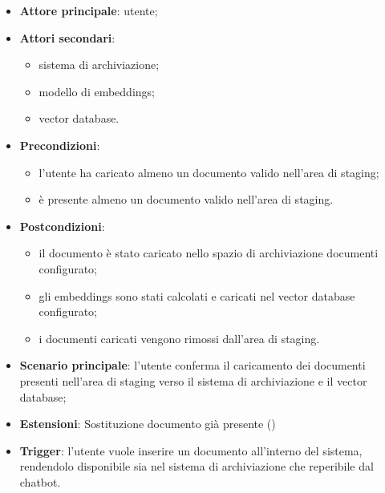 \documentclass[10pt, a4paper]{article}
\begin{document}
    \begin{itemize}
        \item \textbf{Attore principale}: utente;
        \item \textbf{Attori secondari}:
        \begin{itemize}
            \item sistema di archiviazione;
            \item modello di embeddings;
            \item vector database.
        \end{itemize}
        \item \textbf{Precondizioni}:
            \begin{itemize}
                \item l’utente ha caricato almeno un documento valido nell’area di staging;
                \item è presente almeno un documento valido nell’area di staging.
            \end{itemize}
        \item \textbf{Postcondizioni}:
        \begin{itemize}
            \item il documento è stato caricato nello spazio di archiviazione documenti configurato;
            \item gli embeddings sono stati calcolati e caricati nel vector database configurato;
            \item i documenti caricati vengono rimossi dall’area di staging.
        \end{itemize}
        \item \textbf{Scenario principale}: l’utente conferma il caricamento dei documenti presenti nell’area di staging verso il sistema di archiviazione e il vector database;
        \item \textbf{Estensioni}: Sostituzione documento già presente ()
        \item \textbf{Trigger}: l’utente vuole inserire un documento all’interno del sistema, rendendolo disponibile sia nel sistema di archiviazione che reperibile dal chatbot.
    \end{itemize}

\end{document}

